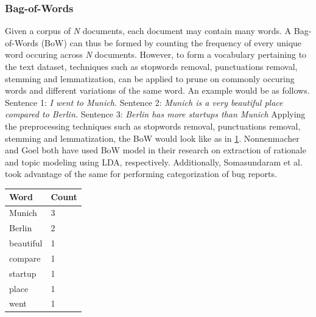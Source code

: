 \documentclass[a4paper,12pt,twoside]{report}
\begin{document}
\subsubsection{Bag-of-Words}
Given a corpus of \textit{N} documents, each document may contain many words. A Bag-of-Words (BoW) can thus be formed by counting the frequency of every unique word occuring across \textit{N} documents. However, to form a vocabulary pertaining to the text dataset, techniques such as stopwords removal, punctuations removal, stemming and lemmatization, can be applied to prune on commonly occuring words and different variations of the same word. An example would be as follows.
\newline \newline
Sentence 1: \textit{I went to Munich.}
\newline \newline
Sentence 2: \textit{Munich is a very beautiful place compared to Berlin.}
\newline \newline
Sentence 3: \textit{Berlin has more startups than Munich}
\newline \newline
Applying the preprocessing techniques such as stopwords removal, punctuations removal, stemming and lemmatization, the BoW would look like as in \ref{tab:bowExample}. Nonnenmacher\cite{Nonnenmacher2017} and Goel \cite{Goel2017} both have used BoW model in their research on extraction of rationale and topic modeling using LDA, respectively. Additionally, Somasundaram et al. \cite{Somasundaram2012} took advantage of the same for performing categorization of bug reports.
\begin{table} %
    \centering
    \begin{adjustbox}{max width=\columnwidth}
    \def\arraystretch{1} %
    \begin{tabular}{p{2cm} p{2cm}}
        \toprule
        \textbf{Word} & \textbf{Count}\\
        \midrule
			Munich & 3 \\
			Berlin & 2 \\ 
			beautiful & 1 \\ 
			compare & 1 \\ 
			startup & 1 \\
			place & 1 \\ 
			went & 1 \\
        \midrule
    \end{tabular}
    \end{adjustbox}
    \label{tab:bowExample}
\end{table}
\end{document}
